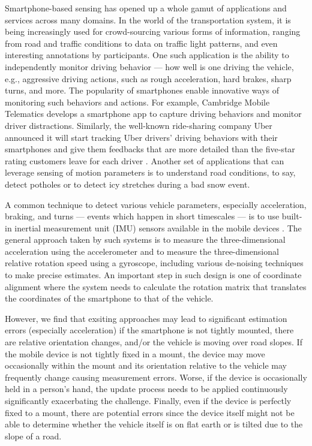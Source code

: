 

Smartphone-based sensing has opened up a whole gamut of applications and services
across many domains. In the world of the transportation system, it is being increasingly used
for crowd-sourcing various forms of information, ranging from road and traffic conditions to data on traffic light patterns,
and even interesting annotations by participants.
One such application is the ability to independently monitor driving behavior --- how well is one
driving the vehicle, e.g., aggressive driving actions, such as rough acceleration, hard brakes, sharp turns, and more.
The popularity of smartphones enable innovative ways of monitoring such behaviors and actions.
For example, Cambridge Mobile Telematics \cite{cmt} 
develops a smartphone
app to capture driving behaviors and monitor driver
distractions.
Similarly, the well-known ride-sharing company Uber announced
it will start tracking Uber drivers' driving behaviors
with their smartphones and give them feedbacks that are more detailed than 
the five-star rating customers leave for each driver \cite{uber}.
Another set of applications that can leverage sensing of motion parameters is to understand road conditions, to
say, detect potholes \cite{eriksson2008pothole} or to detect icy stretches during a bad snow event.

A common technique to detect various vehicle parameters, especially acceleration, braking, and turns ---
events which happen in short timescales --- is to use built-in inertial measurement unit (IMU) 
sensors available in the mobile devices \cite{wang2013sensing,hansenspeed,chen2015invisible}. 
The general approach taken by such systems is to measure the three-dimensional acceleration
using the accelerometer and to measure the three-dimensional relative rotation speed using
a gyroscope, including various de-noising techniques to make precise estimates.
An important step in such design is one of coordinate alignment where the system needs to
calculate the rotation matrix that translates 
the coordinates of the smartphone to that of the vehicle. 



However, we find that exsiting approaches may lead to significant estimation
errors (especially acceleration) if 
the smartphone is not tightly mounted, there are relative orientation changes,
and/or the vehicle is moving over road slopes. 
If the mobile device is not tightly fixed
in a mount, the device may move occasionally within the mount and its orientation 
relative to the vehicle may frequently change causing measurement
errors. Worse, if the device is occasionally held in a person's hand, the update process needs
to be applied continuously significantly exacerbating the challenge. Finally,
even if the device is perfectly fixed to a mount, there are potential errors since the device itself
might not be able to determine whether the vehicle itself is on flat earth or is 
tilted due to the slope of a road.




